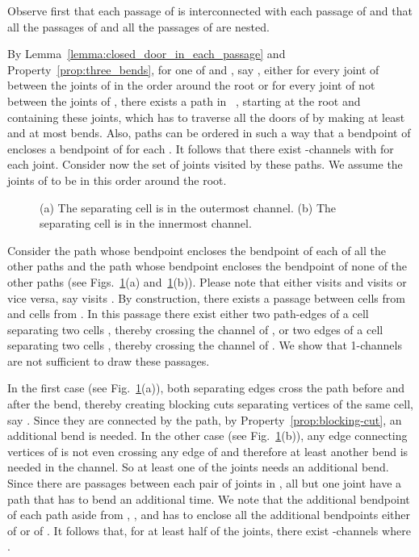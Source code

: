 \documentclass[a4paper,10pt]{llncs}
\newcounter{prop}
\renewenvironment{proof}
{{\bf Proof:}}{\hspace*{\fill}\par\vspace{2mm}}
\newcommand{\T}{\mbox{ }}
\begin{document}
\begin{proof}
Observe first that each passage of  is interconnected with each passage of  and that all the passages of  and all the passages of  are nested.

By Lemma~\ref{lemma:closed_door_in_each_passage} and Property~\ref{prop:three_bends}, for one of  and , say , either for every joint of  between the joints of  in the order around the root or for every joint of  not between the joints of , there exists a path  in \T, starting at the root and containing these joints, which has to traverse all the doors of  by making at least  and at most  bends. Also, paths  can be ordered in such a way that a bendpoint of  encloses a bendpoint of  for each .
It follows that there exist -channels with  for each joint.
Consider now the set of joints  visited by these paths.
We assume the joints of  to be in this order around the root.

\begin{figure}[htb]
\caption{(a) The separating cell  is in the outermost channel. (b) The separating cell  is in the innermost channel.}
  \label{fig:lemma5-cases}
\end{figure}

Consider the path  whose bendpoint encloses the bendpoint of each of all the other paths and the path  whose bendpoint encloses the bendpoint of none of the other paths (see Figs.~\ref{fig:lemma5-cases}(a) and~\ref{fig:lemma5-cases}(b)).
Please note that either  visits  and  visits  or vice versa, say  visits .
By construction, there exists a passage between cells from  and cells from . In this passage there exist either two path-edges  of a cell  separating two cells , thereby crossing the channel of , or two edges of a cell  separating two cells , thereby crossing the channel of . We show that 1-channels are not sufficient to draw these passages.

In the first case (see Fig.~\ref{fig:lemma5-cases}(a)), both separating edges  cross the path  before and after the bend, thereby creating blocking cuts separating vertices of the same cell, say . Since they are connected by the path, by Property~\ref{prop:blocking-cut}, an additional bend is needed.
In the other case (see Fig.~\ref{fig:lemma5-cases}(b)), any edge connecting vertices of  is not even crossing any edge of  and therefore at least another bend is needed in the channel.
So at least one of the joints needs an additional bend. Since there are passages between each pair of joints in , all but one joint  have a path that has to bend an additional time. We note that the additional bendpoint of each path  aside from , , and  has to enclose all the additional bendpoints either of  or of . It follows that, for at least half of the joints, there exist -channels where .
\end{proof}
\end{document}
